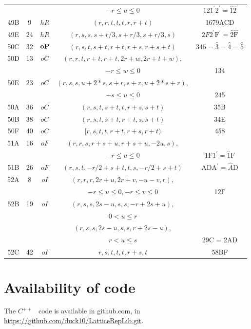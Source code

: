 \documentclass[preprint]{iucr}              %
\numberwithin{equation}{section}
\begin{document}
\begin{table}
\begin{center}
\begin{tabular}{|c|c|c|c|c|}
			&&&$-r \leq u \leq 0$&$121^\prime 2^\prime = \hat{1}\hat{2}$\\
			49B&9&$hR$&$(r,r,t,t,t,r,r+t)$&1679ACD\\
			49E&24&$hR$&$(r,s,s,s+r/3,s+r/3,s+r/3,s)$&$2F2^\prime \text{F}^\prime = \hat{2}\hat{\text{F}}$\\
			\hline
			50C&32&${\bf oP}$&$(r,s,t,s+t,r+t,r+s,r+s+t)$&$345 = \hat{3} = \hat{4} = \hat{5}$\\
			\hline
			50D&13&$oC$&$(r,r,t,r+t,r+t,2r+w,2r+t+w),$&\\
			&&&$-r \leq w \leq 0$&134\\
			50E&23&$oC$&$(r,s,s,u+2*s,s+r,s+r,u+2*s+r),$&\\
			&&&$-s \leq u \leq 0$&245\\
			50A&36&$oC$&$(r,s,t,s+t,t,r+s,s+t)$&35B\\
			50B&38&$oC$&$(r,s,t,s+t,r+t,s,s+t)$&34E\\
			50F&40&$oC$&$[r,s,t,t,r+t,r+s,r+t)$&458\\
			\hline
			51A&16&$oF$&$(r,r,s,r+s+u,r+s+u,-2u,s),$&\\
			&&&$-r \leq u \leq 0$&$\text{1F1}^{\prime} = \hat{1}\text{F}$\\
			51B&26&$oF$&$(r,s,t,-r/2+s+t,t,s,-r/2+s+t)$&$\text{ADA}^{\prime}  = \hat{A}\text{D}$\\
			\hline
			52A&8&$oI$&$(r,r,r,2r+u,2r+v,-u-v,r),$&\\
			&&&$-r \leq u \leq 0, -r \leq v \leq 0$&12F\\
			52B&19&$oI$&$ (r,s,s,2s-u,s,s,-r+2s+u),$&\\
			&&&$0 < u \leq r $&\\
			&&&$ (r,s,s,2s-u,s,s,r+2s-u),$&\\
			&&&$r < u \leq s $&29C = 2AD\\
			52C&42&$oI$&$r,s,t,t,t,r+s,t$&58BF\\
			\hline
		\end{tabular}
	\end{center}
	\label{NiggliFormsI}
\end{table}%
	
	\section{Availability of code}
	
	The $C^{++}$ ~code is available in github.com, in
	\url{https://github.com/duck10/LatticeRepLib.git}.
	
	
\end{document}
